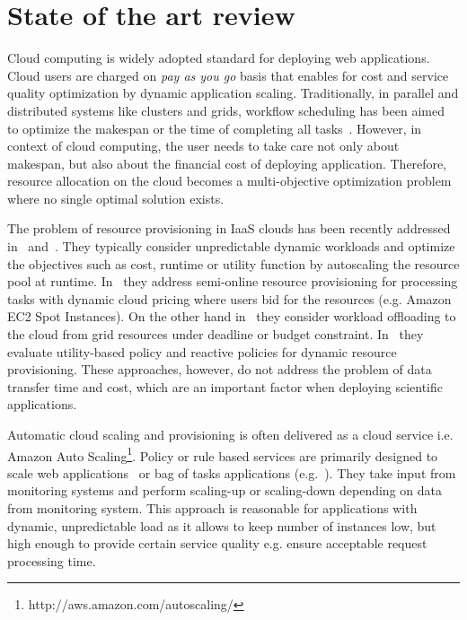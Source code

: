 \chapter{State of the art review} \label{chap:state-of-art}  
 
Cloud computing is widely adopted standard for deploying web applications. Cloud users are charged on \emph{pay as you go} basis that enables for cost and service quality optimization by dynamic application scaling. Traditionally, in parallel and distributed systems like clusters and grids, workflow scheduling has been aimed to optimize the makespan or the time of completing all tasks~\cite{HEFT}. However, in context of cloud computing, the user needs to take care not only about makespan, but also about the financial cost of deploying application. Therefore, resource allocation on the cloud becomes a multi-objective optimization problem where no single optimal solution exists.

The problem of resource provisioning in IaaS clouds has been recently addressed in~\cite{Chen2011, Kim2011} and~\cite{SqueezingOut}. They typically consider unpredictable dynamic workloads and optimize the objectives such as cost, runtime or utility function by autoscaling the resource pool at runtime. In~\cite{Chen2011} they address semi-online resource provisioning for processing tasks with dynamic cloud pricing where users bid for the resources (e.g. Amazon EC2 Spot Instances).  On the other hand in~\cite{Kim2011} they consider workload offloading to the cloud from grid resources under deadline or budget constraint. In~\cite{SqueezingOut} they evaluate utility-based policy and reactive policies for dynamic resource provisioning. These approaches, however, do not address the problem of data transfer time and cost, which are an important factor when deploying scientific applications.

Automatic cloud scaling and provisioning is often delivered as a cloud service i.e. Amazon Auto Scaling\footnote{http://aws.amazon.com/autoscaling/}. Policy or rule based services are primarily designed to scale web applications~\cite{SqueezingOut} or bag of tasks applications (e.g.~\cite{ElasticSite, Kim2011}). They take input from monitoring systems and perform scaling-up or scaling-down depending on data from monitoring system. This approach is reasonable for applications with dynamic, unpredictable load as it allows to keep number of instances low, but high enough to provide certain service quality e.g. ensure acceptable request processing time.

